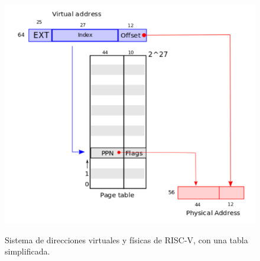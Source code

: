 \documentclass{libs/ufc_format}
\begin{document}
\begin{frame}{}
    \begin{figure}
        \centering
        \caption{Sistema de direcciones virtuales y físicas de RISC-V, con una tabla simplificada. \cite{xv6_book}}
        \includegraphics[scale=0.35]{libs/img/riscv_address.png}
        \label{fig:tabla_paginas_lineal}
    \end{figure}
\end{frame}
\end{document}

